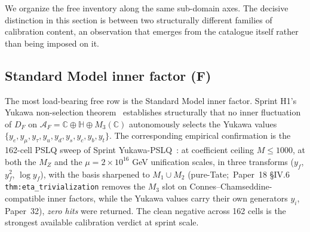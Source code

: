 \documentclass[11pt,a4paper]{article}
\theoremstyle{plain}
\theoremstyle{definition}
\newcommand{\AF}{\mathcal{A}_F}
\newcommand{\DF}{D_F}
\newcommand{\C}{\mathbb{C}}
\newcommand{\HH}{\mathbb{H}}
\begin{document}
We organize the free inventory along the same sub-domain axes. The decisive distinction in this section is between two structurally different families of calibration content, an observation that emerges from the catalogue itself rather than being imposed on it.

\subsection{Standard Model inner factor (F)}
\label{sec:free_inner}

The most load-bearing free row is the Standard Model inner factor. Sprint H1's Yukawa non-selection theorem~\cite{paper32} establishes structurally that no inner fluctuation of $\DF$ on $\AF = \C \oplus \HH \oplus M_3(\C)$ autonomously selects the Yukawa values $\{y_e, y_\mu, y_\tau, y_u, y_d, y_s, y_c, y_b, y_t\}$. The corresponding empirical confirmation is the 162-cell PSLQ sweep of Sprint Yukawa-PSLQ~\cite{debug_yukawa_pslq}:  at coefficient ceiling $M \le 1000$, at both the $M_Z$ and the $\mu = 2 \times 10^{16}$ GeV unification scales, in three transforms ($y_f$, $y_f^2$, $\log y_f$), with the basis sharpened to $M_1 \cup M_2$ (pure-Tate;\ Paper~18 \S IV.6 \texttt{thm:eta\_trivialization} removes the $M_3$ slot on Connes--Chamseddine-compatible inner factors, while the Yukawa values carry their own generators $y_i$, Paper~32), \emph{zero hits} were returned. The clean negative across 162 cells is the strongest available calibration verdict at sprint scale.
\end{document}
